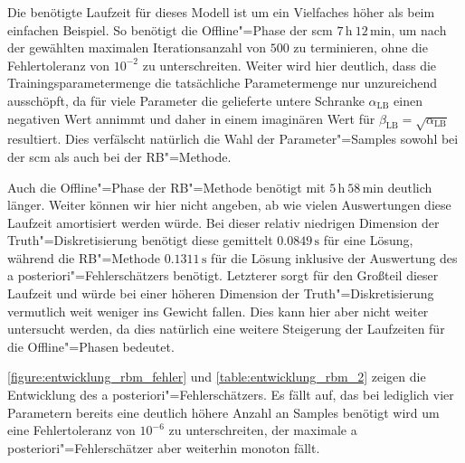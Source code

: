 \documentclass[../main.tex]{subfiles}
\begin{document}
Die benötigte Laufzeit für dieses Modell ist um ein Vielfaches höher als beim einfachen Beispiel.
So benötigt die Offline"=Phase der \ac{scm} $7\,\mathrm{h}~12\,\mathrm{min}$, um nach der gewählten maximalen Iterationsanzahl von $500$ zu terminieren, ohne die Fehlertoleranz von $10^{-2}$ zu unterschreiten.
Weiter wird hier deutlich, dass die Trainingsparametermenge die tatsächliche Parametermenge nur unzureichend ausschöpft, da für viele Parameter die gelieferte untere Schranke $\alpha_{\mathrm{LB}}$ einen negativen Wert annimmt und daher in einem imaginären Wert für $\beta_{\mathrm{LB}} = \sqrt{\alpha_{\mathrm{LB}}}$ resultiert.
Dies verfälscht natürlich die Wahl der Parameter"=Samples sowohl bei der \ac{scm} als auch bei der RB"=Methode.

Auch die Offline"=Phase der RB"=Methode benötigt mit $5\,\mathrm{h}~58\,\mathrm{min}$ deutlich länger.
Weiter können wir hier nicht angeben, ab wie vielen Auswertungen diese Laufzeit amortisiert werden würde.
Bei dieser relativ niedrigen Dimension der Truth"=Diskretisierung benötigt diese gemittelt $0.0849\,\mathrm{s}$ für eine Lösung, während die RB"=Methode $0.1311\,\mathrm{s}$ für die Lösung inklusive der Auswertung des a posteriori"=Fehlerschätzers benötigt.
Letzterer sorgt für den Großteil dieser Laufzeit und würde bei einer höheren Dimension der Truth"=Diskretisierung vermutlich weit weniger ins Gewicht fallen.
Dies kann hier aber nicht weiter untersucht werden, da dies natürlich eine weitere Steigerung der Laufzeiten für die Offline"=Phasen bedeutet.

\cref{figure:entwicklung_rbm_fehler} und \cref{table:entwicklung_rbm_2} zeigen die Entwicklung des a posteriori"=Fehlerschätzers.
Es fällt auf, das bei lediglich vier Parametern bereits eine deutlich höhere Anzahl an Samples benötigt wird um eine Fehlertoleranz von $10^{-6}$ zu unterschreiten, der maximale a posteriori"=Fehlerschätzer aber weiterhin monoton fällt.
\end{document}
